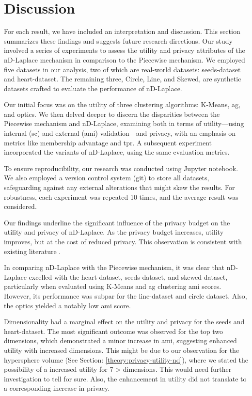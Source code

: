\chapter{Discussion}
For each result, we have included an interpretation and discussion. This section summarizes these findings and suggests future research directions.
Our study involved a series of experiments to assess the utility and privacy attributes of the nD-Laplace mechanism in comparison to the Piecewise mechanism. We employed five datasets in our analysis, two of which are real-world datasets: seeds-dataset and heart-dataset. The remaining three, Circle, Line, and Skewed, are synthetic datasets crafted to evaluate the performance of nD-Laplace.

Our initial focus was on the utility of three clustering algorithms: K-Means, \gls{ag}, and \gls{optics}. We then delved deeper to discern the disparities between the Piecewise mechanism and nD-Laplace, examining both in terms of utility—using internal (\gls{sc}) and external (\gls{ami}) validation—and privacy, with an emphasis on metrics like membership advantage and \gls{tpr}. A subsequent experiment incorporated the variants of nD-Laplace, using the same evaluation metrics.

To ensure reproducibility, our research was conducted using Jupyter notebook. We also employed a version control system (git) to store all datasets, safeguarding against any external alterations that might skew the results. For robustness, each experiment was repeated 10 times, and the average result was considered. 

Our findings underline the significant influence of the privacy budget on the utility and privacy of nD-Laplace. As the privacy budget increases, utility improves, but at the cost of reduced privacy. This observation is consistent with existing literature \citep{sun_distributed_2019, xia_distributed_2020, 9679364}. \newline

In comparing nD-Laplace with the Piecewise mechanism, it was clear that nD-Laplace excelled with the heart-dataset, seeds-dataset, and skewed dataset, particularly when evaluated using K-Means and \gls{ag} clustering \gls{ami} scores. However, its performance was subpar for the line-dataset and circle dataset. Also, the \gls{optics} yielded a notably low \gls{ami} score.

Dimensionality had a marginal effect on the utility and privacy for the seeds and heart-dataset. The most significant outcome was observed for the top two dimensions, which demonstrated a minor increase in \gls{ami}, suggesting enhanced utility with increased dimensions.  This might be due to our observation for the hypersphere volume (See Section: \ref{theory:privacy-utility-nd}), where we stated the possibility of a increased utility for 7 > dimensions. This would need further investigation to tell for sure.
Also, the enhancement in utility did not translate to a corresponding increase in privacy. \newpage

